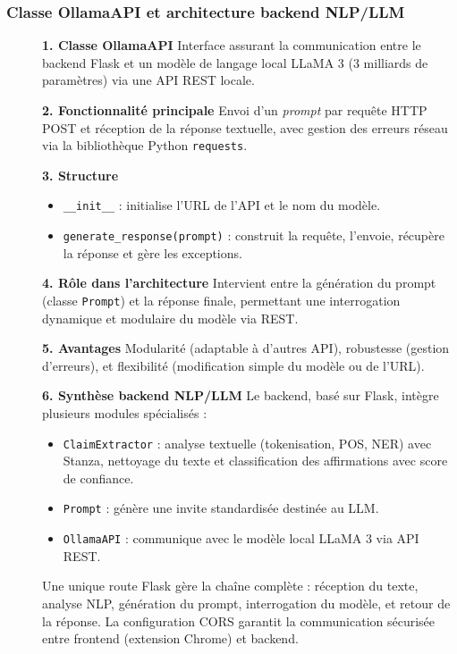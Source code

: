 \begin{description}
\begin{description}
\begin{enumerate}
\end{enumerate}

\end{description}
\subsubsection{Classe OllamaAPI et architecture backend NLP/LLM}

\begin{description}

\item[] \textbf{1. Classe OllamaAPI}  
Interface assurant la communication entre le backend Flask et un modèle de langage local LLaMA 3 (3 milliards de paramètres) via une API REST locale.

\item[] \textbf{2. Fonctionnalité principale}  
Envoi d’un \textit{prompt} par requête HTTP POST et réception de la réponse textuelle, avec gestion des erreurs réseau via la bibliothèque Python \texttt{requests}.

\item[] \textbf{3. Structure}  
\begin{itemize}
    \item \texttt{\_\_init\_\_} : initialise l’URL de l’API et le nom du modèle.
    \item \texttt{generate\_response(prompt)} : construit la requête, l’envoie, récupère la réponse et gère les exceptions.
\end{itemize}

\item[] \textbf{4. Rôle dans l’architecture}  
Intervient entre la génération du prompt (classe \texttt{Prompt}) et la réponse finale, permettant une interrogation dynamique et modulaire du modèle via REST.

\item[] \textbf{5. Avantages}  
Modularité (adaptable à d’autres API), robustesse (gestion d’erreurs), et flexibilité (modification simple du modèle ou de l’URL).

\item[] \textbf{6. Synthèse backend NLP/LLM}  
Le backend, basé sur Flask, intègre plusieurs modules spécialisés :  
\begin{itemize}
    \item \texttt{ClaimExtractor} : analyse textuelle (tokenisation, POS, NER) avec Stanza, nettoyage du texte et classification des affirmations avec score de confiance.
    \item \texttt{Prompt} : génère une invite standardisée destinée au LLM.
    \item \texttt{OllamaAPI} : communique avec le modèle local LLaMA 3 via API REST.
\end{itemize}
Une unique route Flask gère la chaîne complète : réception du texte, analyse NLP, génération du prompt, interrogation du modèle, et retour de la réponse.  
La configuration CORS garantit la communication sécurisée entre frontend (extension Chrome) et backend.


\end{description}
\end{description}
